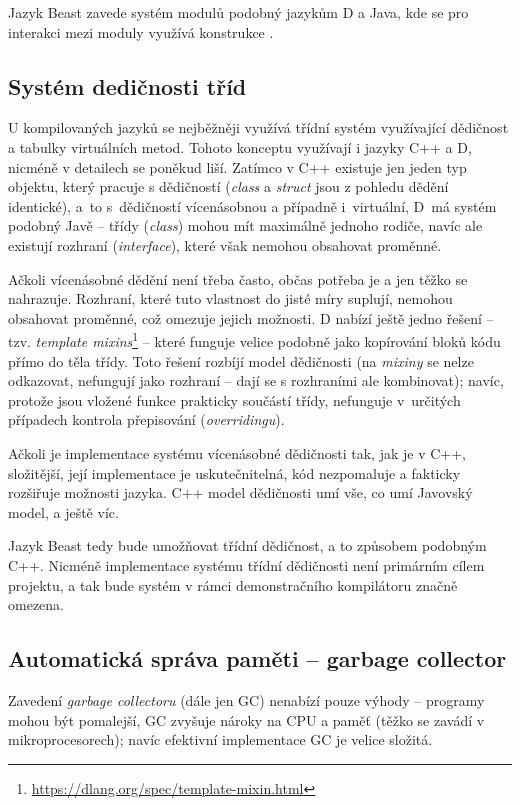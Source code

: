 Jazyk Beast zavede systém modulů podobný jazykům D a Java, kde se pro interakci mezi moduly využívá konstrukce .

\subsection{Systém dedičnosti tříd} U kompilovaných jazyků se nejběžněji využívá třídní systém využívající dědičnost a tabulky virtuálních metod. Tohoto konceptu využívají i jazyky C++ a D, nicméně v detailech se poněkud liší. Zatímco v C++ existuje jen jeden typ objektu, který pracuje s dědičností (\textit{class} a \textit{struct} jsou z pohledu dědění identické), a~to s~dědičností vícenásobnou a případně i~virtuální, D~má systém podobný Javě -- třídy (\textit{class}) mohou mít maximálně jednoho rodiče, navíc ale existují rozhraní (\textit{interface}), které však nemohou obsahovat proměnné.

Ačkoli vícenásobné dědění není třeba často, občas potřeba je a jen těžko se nahrazuje. Rozhraní, které tuto vlastnost do jisté míry suplují, nemohou obsahovat proměnné, což omezuje jejich možnosti. D nabízí ještě jedno řešení -- tzv. \textit{template mixins}\footnote{\url{https://dlang.org/spec/template-mixin.html}} -- které funguje velice podobně jako kopírování bloků kódu přímo do těla třídy. Toto řešení rozbíjí model dědičnosti (na \textit{mixiny} se nelze odkazovat, nefungují jako rozhraní -- dají se s rozhraními ale kombinovat); navíc, protože jsou vložené funkce prakticky součástí třídy, nefunguje v~určitých případech kontrola přepisování (\textit{overridingu}).

Ačkoli je implementace systému vícenásobné dědičnosti tak, jak je v C++, složitější, její implementace je uskutečnitelná, kód nezpomaluje a fakticky rozšiřuje možnosti jazyka. C++ model dědičnosti umí vše, co umí Javovský model, a ještě víc.

Jazyk Beast tedy bude umožňovat třídní dědičnost, a to způsobem podobným C++. Nicméně implementace systému třídní dědičnosti není primárním cílem projektu, a tak bude systém v rámci demonstračního kompilátoru značně omezena.

\subsection{Automatická správa paměti -- garbage collector}
Zavedení \textit{garbage collectoru} (dále jen GC) nenabízí pouze výhody -- programy mohou být pomalejší, GC zvyšuje nároky na CPU a paměť (těžko se zavádí v mikroprocesorech); navíc efektivní implementace GC je velice složitá.


